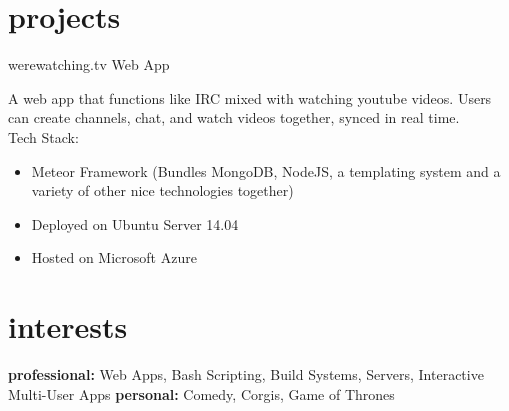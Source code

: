 \documentclass[]{friggeri-cv} %
\begin{document}
\section{projects}

\begin{entrylist}


\entry
{}
{werewatching.tv}
{Web App}
{A web app that functions like IRC mixed with watching youtube videos. Users can create channels, chat, and watch videos together, synced in real time. \\Tech Stack:
\begin{itemize}
\item Meteor Framework (Bundles MongoDB, NodeJS, a templating system and a variety of other nice technologies together)
\item Deployed on Ubuntu Server 14.04
\item Hosted on Microsoft Azure
\end{itemize}
}


\end{entrylist}


\section{interests}

\textbf{professional:} Web Apps, Bash Scripting, Build Systems, Servers, Interactive Multi-User Apps \textbf{personal:} Comedy, Corgis, Game of Thrones
\end{document}
